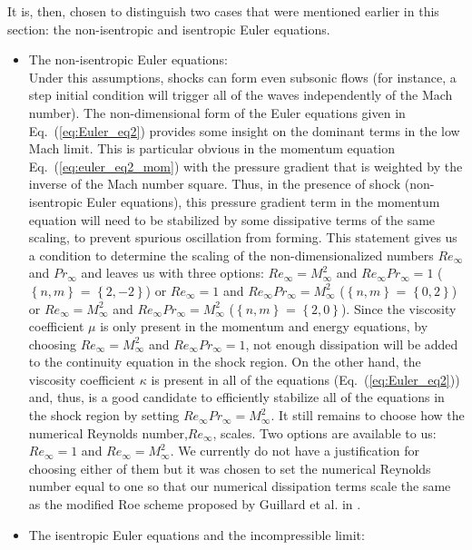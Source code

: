 \documentclass[preprint,10pt]{elsarticle}
\newcommand{\eqt}[1]{Eq.~(\ref{#1})}                     %
\begin{document}
It is, then, chosen to distinguish two cases that were mentioned earlier in this section: the non-isentropic and isentropic Euler equations.
\begin{itemize}
\item The non-isentropic Euler equations:\\
Under this assumptions, shocks can form even subsonic flows (for instance, a step initial condition will trigger all of the waves independently of the Mach number). The non-dimensional form of the Euler equations given in \eqt{eq:Euler_eq2} provides some insight on the dominant terms in the low Mach limit. This is particular obvious in the momentum equation \eqt{eq:euler_eq2_mom} with the pressure gradient that is weighted by the inverse of the Mach number square. Thus, in the presence of shock (non-isentropic Euler equations), this pressure gradient term in the momentum equation will need to be stabilized by some dissipative terms of the same scaling, to prevent spurious oscillation from forming. This statement gives us a condition to determine the scaling of the non-dimensionalized numbers $Re_{\infty}$ and $Pr_{\infty}$ and leaves us with three options: $Re_{\infty} = M_{\infty}^2$ and $Re_{\infty}Pr_{\infty} = 1$ ($\left\{ n,m \right\}$ = $\left\{ 2, -2 \right\}$) or $Re_{\infty} = 1$ and $Re_{\infty}Pr_{\infty} = M_{\infty}^2$ ($\left\{ n,m \right\}$ = $\left\{ 0, 2 \right\}$) or $Re_{\infty} = M_{\infty}^2$ and $Re_{\infty}Pr_{\infty} = M_{\infty}^2$ ($\left\{ n,m \right\}$ = $\left\{ 2, 0 \right\}$). Since the viscosity coefficient $\mu$ is only present in the momentum and energy equations, by choosing $Re_{\infty} = M_{\infty}^2$ and $Re_{\infty}Pr_{\infty} = 1$, not enough dissipation will be added to the continuity equation in the shock region. On the other hand, the viscosity coefficient $\kappa$ is present in all of the equations (\eqt{eq:Euler_eq2}) and, thus, is a good candidate to efficiently stabilize all of the equations in the shock region by setting $Re_{\infty}Pr_{\infty} = M_{\infty}^2$. It still remains to choose how the numerical Reynolds number,$Re_{\infty}$, scales. Two options are available to us: $Re_{\infty}=1$ and $Re_{\infty}=M_{\infty}^2$. We currently do not have a justification for choosing either of them but it was chosen to set the numerical Reynolds number equal to one so that our numerical dissipation terms scale the same as the modified Roe scheme proposed by Guillard et al. in \cite{LowMach1}.
\item The isentropic Euler equations and the incompressible limit:\\

\end{itemize}
\end{document}
